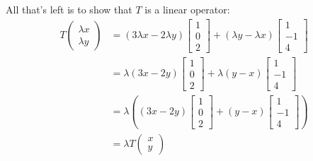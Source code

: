 \documentclass{article}
\begin{document}
All that's left is to show that $T$ is a linear operator:
\begin{align*}
  T\begin{pmatrix}
    \lambda x\\\lambda y
  \end{pmatrix}&=(3\lambda x-2\lambda y)\begin{bmatrix}
    1\\0\\2
  \end{bmatrix}+(\lambda y-\lambda x)\begin{bmatrix}
    1\\-1\\4
  \end{bmatrix}\\
  &=\lambda(3x-2 y)\begin{bmatrix}
    1\\0\\2
  \end{bmatrix}+\lambda(y-x)\begin{bmatrix}
    1\\-1\\4
  \end{bmatrix}\\
  &=\lambda\left((3x-2 y)\begin{bmatrix}
    1\\0\\2
  \end{bmatrix}+(y-x)\begin{bmatrix}
    1\\-1\\4
  \end{bmatrix}\right)\\
  &=\lambda T\begin{pmatrix}
    x\\y
  \end{pmatrix}
\end{align*}
\end{document}
